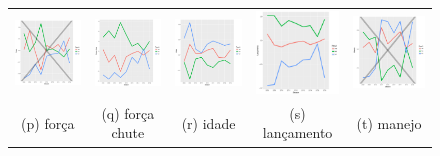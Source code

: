 \documentclass[review]{elsarticle}
\begin{document}
\begin{figure}
\begin{tabular}{ccccc}
  \includegraphics[width=25mm]{forca_result} & \includegraphics[width=25mm]{forcachute_result}  &   \includegraphics[width=25mm]{idade_result} &
  \includegraphics[width=25mm]{lancamento_result}  & \includegraphics[width=25mm]{manejo_result}  \\
 \scriptsize{(p) força} & \scriptsize{(q) força chute } & \scriptsize{(r) idade} & \scriptsize{(s) lançamento} & \scriptsize{(t) manejo}\\[3pt]
 

\end{tabular}
\end{figure}
\end{document}
